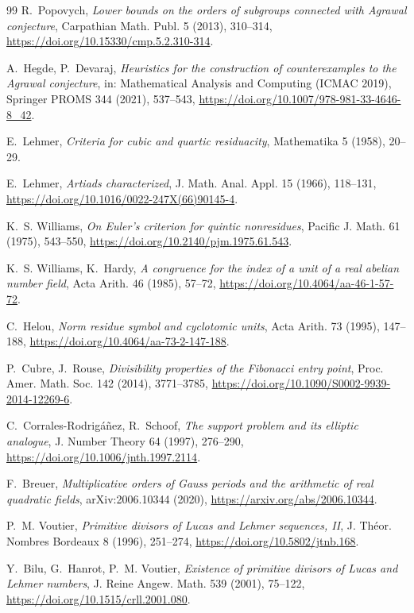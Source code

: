 \documentclass[11pt]{amsart}
\theoremstyle{definition}
\theoremstyle{remark}
\begin{document}
\begin{thebibliography}{99}
R.~Popovych,
\emph{Lower bounds on the orders of subgroups connected with Agrawal
conjecture},
Carpathian Math. Publ. 5 (2013), 310--314,
\url{https://doi.org/10.15330/cmp.5.2.310-314}.

A.~Hegde, P.~Devaraj,
\emph{Heuristics for the construction of counterexamples to the Agrawal
conjecture},
in: Mathematical Analysis and Computing (ICMAC 2019), Springer PROMS 344
(2021), 537--543,
\url{https://doi.org/10.1007/978-981-33-4646-8_42}.

E.~Lehmer,
\emph{Criteria for cubic and quartic residuacity},
Mathematika 5 (1958), 20--29.

E.~Lehmer,
\emph{Artiads characterized},
J. Math. Anal. Appl. 15 (1966), 118--131,
\url{https://doi.org/10.1016/0022-247X(66)90145-4}.

K.~S. Williams,
\emph{On Euler's criterion for quintic nonresidues},
Pacific J. Math. 61 (1975), 543--550,
\url{https://doi.org/10.2140/pjm.1975.61.543}.

K.~S. Williams, K.~Hardy,
\emph{A congruence for the index of a unit of a real abelian number field},
Acta Arith. 46 (1985), 57--72,
\url{https://doi.org/10.4064/aa-46-1-57-72}.

C.~Helou,
\emph{Norm residue symbol and cyclotomic units},
Acta Arith. 73 (1995), 147--188,
\url{https://doi.org/10.4064/aa-73-2-147-188}.

P.~Cubre, J.~Rouse,
\emph{Divisibility properties of the Fibonacci entry point},
Proc. Amer. Math. Soc. 142 (2014), 3771--3785,
\url{https://doi.org/10.1090/S0002-9939-2014-12269-6}.

C.~Corrales-Rodrigáñez, R.~Schoof,
\emph{The support problem and its elliptic analogue},
J. Number Theory 64 (1997), 276--290,
\url{https://doi.org/10.1006/jnth.1997.2114}.

F.~Breuer,
\emph{Multiplicative orders of Gauss periods and the arithmetic of real
quadratic fields},
arXiv:2006.10344 (2020),
\url{https://arxiv.org/abs/2006.10344}.

P.~M. Voutier,
\emph{Primitive divisors of Lucas and Lehmer sequences, II},
J. Théor. Nombres Bordeaux 8 (1996), 251--274,
\url{https://doi.org/10.5802/jtnb.168}.

Y.~Bilu, G.~Hanrot, P.~M. Voutier,
\emph{Existence of primitive divisors of Lucas and Lehmer numbers},
J. Reine Angew. Math. 539 (2001), 75--122,
\url{https://doi.org/10.1515/crll.2001.080}.


\end{thebibliography}
\end{document}

